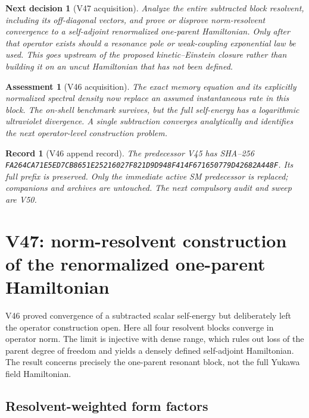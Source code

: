 \documentclass[11pt]{article}
\newtheorem{decision}[theorem]{Next decision}
\newtheorem{assessment}[theorem]{Assessment}
\newtheorem{record}[theorem]{Record}
\theoremstyle{remark}
\begin{document}
\begin{decision}[V47 acquisition]
\label{dec:v20v46-next}
Analyze the entire subtracted block resolvent, including its
off-diagonal vectors, and prove or disprove norm-resolvent
convergence to a self-adjoint renormalized one-parent Hamiltonian.
Only after that operator exists should a resonance pole or
weak-coupling exponential law be used.  This goes upstream of
the proposed kinetic--Einstein closure rather than building it
on an uncut Hamiltonian that has not been defined.
\end{decision}

\begin{assessment}[V46 acquisition]
\label{ass:v20v46}
The exact memory equation and its explicitly normalized spectral
density now replace an assumed instantaneous rate in this block.
The on-shell benchmark survives, but the full self-energy has
a logarithmic ultraviolet divergence.  A single subtraction
converges analytically and identifies the next operator-level
construction problem.
\end{assessment}

\begin{record}[V46 append record]
\label{rec:v20v46}
The predecessor V45 has SHA--256
\texttt{FA264CA71E5ED7CB8651E25216027F821D9D948F414F671650779D42682A448F}.
Its full prefix is preserved.  Only the immediate active SM
predecessor is replaced; companions and archives are untouched.
The next compulsory audit and sweep are V50.
\end{record}



\section{V47: norm-resolvent construction of the renormalized one-parent Hamiltonian}
\label{sec:v20v47}

V46 proved convergence of a subtracted scalar self-energy but deliberately
left the operator construction open.  Here all four resolvent blocks
converge in operator norm.  The limit is injective with dense range,
which rules out loss of the parent degree of freedom and yields a
densely defined self-adjoint Hamiltonian.  The result concerns precisely
the one-parent resonant block, not the full Yukawa field Hamiltonian.

\subsection{Resolvent-weighted form factors}
\end{document}
